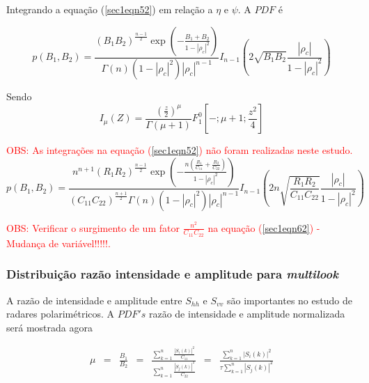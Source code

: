 \documentclass[12pt,a4paper]{article}
\begin{document}
Integrando a equação (\ref{sec1eqn52}) em relação a $\eta$ e $\psi$. A $PDF$ é

\begin{equation}\label{sec1eqn60}
	p(B_1,B_2)=\frac{\left(B_1B_2\right)^{\frac{n-1}{2}}\exp\left(-\frac{B_1+B_2}{1-\left|\rho_c\right|^2}\right)}{\Gamma(n)(1-\left|\rho_c\right|^2)|\rho_c|^{n-1}}I_{n-1}\left(2\sqrt{B_1B_2}\frac{|\rho_c|}{1-|\rho_c|^2}\right)
\end{equation}

Sendo
\begin{equation}\label{sec1eqn61}
	I_{\mu}(Z)=\frac{(\frac{z}{2})^{\mu}}{\Gamma(\mu+1)} F_{1}^{0}[-;\mu+1;\frac{z^2}{4}]
\end{equation}

\textcolor{red}{OBS: As integrações na equação (\ref{sec1eqn52}) não foram realizadas neste estudo.}
\begin{equation}\label{sec1eqn62}
	p(B_1,B_2)=\frac{n^{n+1}\left(R_1R_2\right)^{\frac{n-1}{2}}\exp\left(-\frac{n(\frac{R_1}{C_{11}}+\frac{R_2}{C_{22}})}{1-\left|\rho_c\right|^2}\right)}{(C_{11}C_{22})^{\frac{n+1}{2}}\Gamma(n)(1-\left|\rho_c\right|^2)|\rho_c|^{n-1}}I_{n-1}\left(2n\sqrt{\frac{R_1R_2}{C_{11}C_{22}}}\frac{|\rho_c|}{1-|\rho_c|^2}\right)
\end{equation}

\textcolor{red}{OBS: Verificar o surgimento de um fator $\frac{n^2}{C_{11}C_{22}}$ na equação  (\ref{sec1eqn62}) - Mudança de variável!!!!!.}

\subsubsection{Distribuição razão intensidade e amplitude para {\it multilook}}

A razão de intensidade e amplitude entre $S_{hh}$ e $S_{vv}$ são importantes no estudo de radares polarimétricos. A $PDF's$ razão de intensidade e amplitude normalizada será mostrada agora

\begin{equation}\label{sec1eqn63}
\begin{array}{ccccccc}
	\mu&=&\frac{B_1}{B_2}&=&\frac{\displaystyle{\sum_{k=1}^{n}\frac{|S_i(k)|^2}{C_{11}}}}{\displaystyle{\sum_{k=1}^{n}\frac{|S_j(k)|^2}{C_{22}}}}&=&\frac{\displaystyle{\sum_{k=1}^{n}|S_i(k)|^2}}{\tau\displaystyle{\sum_{k=1}^{n}|S_j(k)|^2}}\\
\end{array}
\end{equation}
\end{document}
